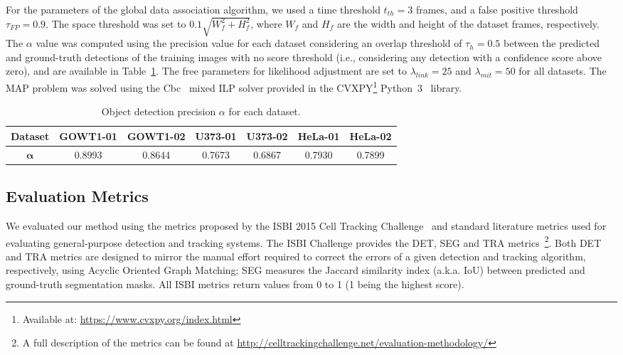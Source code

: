 \documentclass{article}
\begin{document}
For the parameters of the global data association algorithm, we used a time threshold $t_{th}=3$ frames, and a false positive threshold $\tau_{FP}=0.9$. The space threshold was set to $0.1\sqrt{W_f^2+H_f^2}$, where $W_f$ and $H_f$ are the width and height of the dataset frames, respectively. The $\alpha$ value was computed using the precision value for each dataset considering an overlap threshold of $\tau_h=0.5$ between the predicted and ground-truth detections of the training images with no score threshold (i.e., considering any detection with a confidence score above zero), and are available in Table~\ref{tab:alpha_values}. The free parameters for likelihood adjustment are set to $\lambda_{link}=25$ and $\lambda_{mit}=50$ for all datasets. The MAP problem was solved using the Cbc~\cite{cbc} mixed ILP solver provided in the CVXPY\footnote{Available at: \url{https://www.cvxpy.org/index.html}} Python~3~\cite{python} library.

\begin{table}[]
    \caption{Object detection precision $\alpha$ for each dataset.}
    \centering
    \begin{tabular}{c|c|c|c|c|c|c}
        \textbf{Dataset} & GOWT1-01 & GOWT1-02 & U373-01 & U373-02 & HeLa-01 & HeLa-02 \\ \hline
        $\bm{\alpha}$ &  0.8993 & 0.8644 & 0.7673 & 0.6867 & 0.7930 & 0.7899
    \end{tabular}
\label{tab:alpha_values}
\end{table}

\subsection{Evaluation Metrics}\label{sec:metrics}

We evaluated our method using the metrics proposed by the ISBI 2015 Cell Tracking Challenge~\cite{isbi} and standard literature metrics used for evaluating general-purpose detection and tracking systems. The ISBI Challenge provides the DET, SEG and TRA metrics~\footnote{A full description of the metrics can be found at \url{http://celltrackingchallenge.net/evaluation-methodology/}}. Both DET and TRA metrics are designed to mirror the manual effort required to correct the errors of a given detection and tracking algorithm, respectively, using Acyclic Oriented Graph Matching; SEG measures the Jaccard similarity index (a.k.a. IoU) between predicted and ground-truth segmentation masks. All ISBI metrics return values from 0 to 1 (1 being the highest score). 
\end{document}
